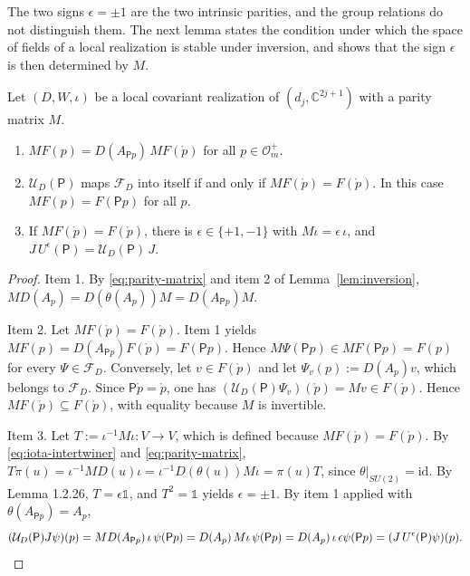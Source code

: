 \noindent The two signs $\epsilon=\pm1$ are the two intrinsic parities, and the group relations do not distinguish them. The next lemma states the condition under which the space of fields of a local realization is stable under inversion, and shows that the sign $\epsilon$ is then determined by $M$.

\begin{lemma}\label{lem:parity-stable}
	Let $(D,W,\iota)$ be a local covariant realization of $(d_j,\mathbb{C}^{2j+1})$ with a parity matrix $M$.
	\begin{enumerate}
		\item $MF(p)=D(A_{\mathsf{P}p})\,MF(\mathring{p})$ for all $p\in\mathcal{O}_m^+$.
		\item $\mathcal{U}_D(\mathsf{P})$ maps $\mathcal{F}_D$ into itself if and only if $MF(\mathring{p})=F(\mathring{p})$. In this case $MF(p)=F(\mathsf{P}p)$ for all $p$.
		\item If $MF(\mathring{p})=F(\mathring{p})$, there is $\epsilon\in\{+1,-1\}$ with $M\iota=\epsilon\,\iota$, and $J\,U^\epsilon(\mathsf{P})=\mathcal{U}_D(\mathsf{P})\,J$.
	\end{enumerate}
\end{lemma}

\begin{proof}
	Item 1. By \eqref{eq:parity-matrix} and item 2 of Lemma~\ref{lem:inversion}, $MD(A_p)=D(\theta(A_p))M=D(A_{\mathsf{P}p})M$.
	
	Item 2. Let $MF(\mathring{p})=F(\mathring{p})$. Item 1 yields $MF(p)=D(A_{\mathsf{P}p})F(\mathring{p})=F(\mathsf{P}p)$. Hence $M\Psi(\mathsf{P}p)\in MF(\mathsf{P}p)=F(p)$ for every $\Psi\in\mathcal{F}_D$. Conversely, let $v\in F(\mathring{p})$ and let $\Psi_v(p):=D(A_p)v$, which belongs to $\mathcal{F}_D$. Since $\mathsf{P}\mathring{p}=\mathring{p}$, one has $(\mathcal{U}_D(\mathsf{P})\Psi_v)(\mathring{p})=Mv\in F(\mathring{p})$. Hence $MF(\mathring{p})\subseteq F(\mathring{p})$, with equality because $M$ is invertible.
	
	Item 3. Let $T:=\iota^{-1}M\iota:V\to V$, which is defined because $MF(\mathring{p})=F(\mathring{p})$. By \eqref{eq:iota-intertwiner} and \eqref{eq:parity-matrix}, $T\pi(u)=\iota^{-1}MD(u)\iota=\iota^{-1}D(\theta(u))M\iota=\pi(u)T$, since $\theta|_{SU(2)}=\mathrm{id}$. By Lemma 1.2.26, $T=\epsilon\mathbb{1}$, and $T^2=\mathbb{1}$ yields $\epsilon=\pm1$. By item 1 applied with $\theta(A_{\mathsf{P}p})=A_p$,
	\begin{equation*}
		(\mathcal{U}_D(\mathsf{P})J\psi)(p)=MD(A_{\mathsf{P}p})\,\iota\,\psi(\mathsf{P}p)=D(A_p)\,M\iota\,\psi(\mathsf{P}p)=D(A_p)\,\iota\,\epsilon\psi(\mathsf{P}p)=(J\,U^\epsilon(\mathsf{P})\psi)(p).\qedhere
	\end{equation*}
\end{proof}

